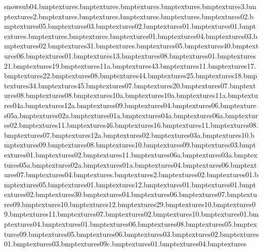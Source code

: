 snowsub04.bmp textures\tapcold.bmp textures\taphot.bmp textures\tapbot.bmp textures\tapside.bmp textures\wastepipes3.bmp textures\sinkedge2.bmp textures\sinkplughole.bmp textures\sinkhole.bmp textures\sinkshad.bmp textures\sinkedge.bmp textures\bluetree02.bmp textures\snowpud05.bmp textures\snowpud03.bmp textures\snowpud02.bmp textures\snowpud01.bmp textures\igloo01.bmp textures\post.bmp textures\tazwanted.bmp textures\tazwantedposback.bmp textures\purptree01.bmp textures\purptree04.bmp textures\purptree03.bmp textures\purptree02.bmp textures\snowturf31.bmp textures\snowtile.bmp textures\sdomestrip05.bmp textures\snowturf40.bmp textures\snowdecal06.bmp textures\snowturf01.bmp textures\snowturf13.bmp textures\sdomestripi08.bmp textures\snowfoot01.bmp textures\snowturf21.bmp textures\snowturf19.bmp textures\sdomestrip11a.bmp textures\snowturf43.bmp textures\snowturf11.bmp textures\snowturf17.bmp textures\snowturf22.bmp textures\snowdecal08.bmp textures\snowturf44.bmp textures\snowturf25.bmp textures\snowturf18.bmp textures\snowturf34.bmp textures\snowturf45.bmp textures\snowdecal07.bmp textures\snowturf20.bmp textures\sdomestrip07.bmp textures\snowturf08.bmp textures\sdomestrip08.bmp textures\sdomestrip10a.bmp textures\sdomestripblu10a.bmp textures\sdomestripblu11a.bmp textures\sdomestripblu04a.bmp textures\sdomestrip12a.bmp textures\sdomestrip09.bmp textures\sdomestrip04.bmp textures\sdomestrip06.bmp textures\sdomestrip05a.bmp textures\sdomestrip02a.bmp textures\sdomestrip01a.bmp textures\sdomestrip04a.bmp textures\sdomestrip06a.bmp textures\sdomestrip02.bmp textures\snowbeam11.bmp textures\snowturf46.bmp textures\snowturf16.bmp textures\sdomestrip11.bmp textures\sdomestripblu08.bmp textures\sdomestripblu07.bmp textures\sdomestripblu12a.bmp textures\snowturf02.bmp textures\sdomestrip03a.bmp textures\sdomestrip10.bmp textures\sdomestripblu09.bmp textures\snowbeam08.bmp textures\snowbeam10.bmp textures\snowbeam09.bmp textures\snowbeam03.bmp textures\snowboard01.bmp textures\snowboard02.bmp textures\sdomestripi11.bmp textures\sdomestripblu06a.bmp textures\sdomestripblu03a.bmp textures\sdomestripblu05a.bmp textures\sdomestripblu02a.bmp textures\sdomestripblu01a.bmp textures\sdomestripblu04.bmp textures\sdomestripblu06.bmp textures\snowbeam07.bmp textures\snowbeam04.bmp textures\frozentreats.bmp textures\frozentreats2.bmp textures\snowentrance02.bmp textures\snowentrance01.bmp textures\sdomestripblu05.bmp textures\sdomestrip01.bmp textures\snowbeam12.bmp textures\snowbeam01.bmp textures\snowxmasdoor01.bmp textures\subunk02.bmp textures\snowturf30.bmp textures\sdomestripi04.bmp textures\sdomestripi06.bmp textures\sdomestripi07.bmp textures\sdomestripi09.bmp textures\sdomestripi10.bmp textures\sdomestripi12.bmp textures\snowturf29.bmp textures\snowcream10.bmp textures\snowcream09.bmp textures\snowcream11.bmp textures\snowindow07.bmp textures\snowindow02.bmp textures\snowindow10.bmp textures\snowindow01.bmp textures\bluetree04.bmp textures\bluetree01.bmp textures\snowindow06.bmp textures\snowindow08.bmp textures\snowindow05.bmp textures\snowindow09.bmp textures\snowbeam05.bmp textures\snowbeam06.bmp textures\snowpole03.bmp textures\snowpole02.bmp textures\snowpole01.bmp textures\sdomestrip03.bmp textures\snowturf09c.bmp textures\snowbulbs01.bmp textures\frozentreats04.bmp textures\sno